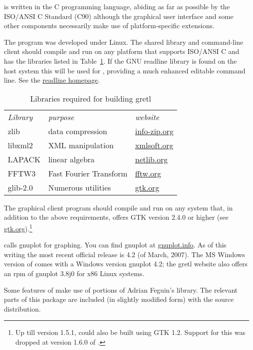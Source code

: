  is written in the C programming language, abiding as far
as possible by the ISO/ANSI C Standard (C90) although the graphical
user interface and some other components necessarily make use of
platform-specific extensions.
  
The program was developed under Linux. The shared library and
command-line client should compile and run on any platform that
supports ISO/ANSI C and has the libraries listed in
Table~\ref{tab:depend}.  If the GNU readline library is found on the
host system this will be used for , providing a much
enhanced editable command line.  See the
\href{http://cnswww.cns.cwru.edu/~chet/readline/rltop.html}{readline
  homepage}.

\begin{table}[htbp]
  \centering
  \begin{tabular}{lll}
\textit{Library} & \textit{purpose} & \textit{website} \\ [4pt]
zlib & data compression &  
   \href{http://www.info-zip.org/pub/infozip/zlib/}{info-zip.org} \\
libxml2 & XML manipulation &
   \href{http://xmlsoft.org/}{xmlsoft.org} \\
LAPACK & linear algebra & 
   \href{http://www.netlib.org/lapack/}{netlib.org} \\
FFTW3 & Fast Fourier Transform & 
   \href{http://www.fftw.org/}{fftw.org} \\
glib-2.0 & Numerous utilities & 
  \href{http://www.gtk.org/}{gtk.org}
  \end{tabular}
  \caption{Libraries required for building gretl}
  \label{tab:depend}
\end{table}

The graphical client program should compile and run on any system
that, in addition to the above requirements, offers GTK version 2.4.0
or higher (see \href{http://www.gtk.org/}{gtk.org}).\footnote{Up till
  version 1.5.1,  could also be built using GTK 1.2.
  Support for this was dropped at version 1.6.0 of .}
  
 calls gnuplot for graphing. You can find gnuplot at
\href{http://www.gnuplot.info/}{gnuplot.info}.  As of this writing the
most recent official release is 4.2 (of March, 2007).  The MS Windows
version of  comes with a Windows version gnuplot 4.2; the
gretl website also offers an rpm of gnuplot 3.8j0 for x86 Linux
systems.
  
Some features of  make use of portions of Adrian Feguin's
 library.  The relevant parts of this package are
included (in slightly modified form) with the  source
distribution.
  
